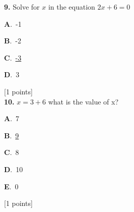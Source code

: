 \documentclass[12pt]{article}
\newcommand{\choice}[3]{%
  \noindent\textbf{#1}.~#2\hfill#3\par\vspace{0.25em}
}
\begin{document}
\noindent \textbf{\textenglish{9.}} {\textenglish{Solve for }}\(x \){\textenglish{ in the equation }}\(2x+6 = 0 \)

\noindent\choice{A}{{\textenglish{-1}}}{}
\noindent\choice{B}{{\textenglish{-2}}}{}
\noindent\choice{C}{\underline{{\textenglish{-3}}}}{}
\noindent\choice{D}{{\textenglish{3}}}{}
\hfill {\textenglish{[1 points]}}\\[0.5em]

\noindent \textbf{\textenglish{10.}} \(x=3+6 \){\textenglish{ what is the value of x?}}

\noindent\choice{A}{{\textenglish{7}}}{}
\noindent\choice{B}{\underline{{\textenglish{9}}}}{}
\noindent\choice{C}{{\textenglish{8}}}{}
\noindent\choice{D}{{\textenglish{10}}}{}
\noindent\choice{E}{{\textenglish{0}}}{}
\hfill {\textenglish{[1 points]}}\\[0.5em]
\end{document}
